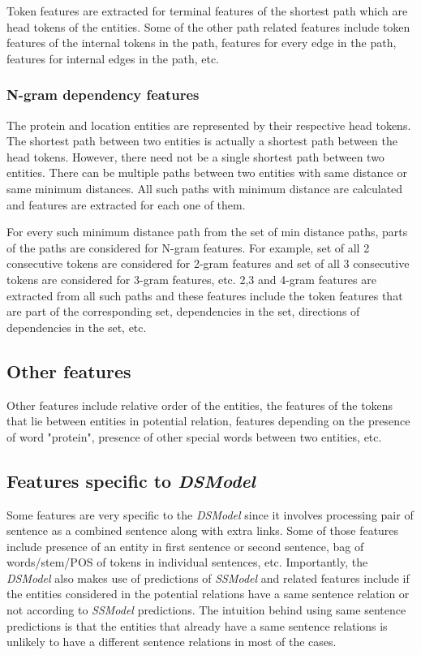 Token features are extracted for terminal features of the shortest path which are head tokens of the entities. Some of the other path related features include token features of the internal tokens in the path, features for every edge in the path, features for internal edges in the path, etc.

\subsubsection*{N-gram dependency features}

The protein and location entities are represented by their respective head tokens.  The shortest path between two entities is actually a shortest path between the head tokens. However, there need not be a single shortest path between two entities. There can be multiple paths between two entities with same distance or same minimum distances. All such paths with minimum distance are calculated and features are extracted for each one of them.

For every such minimum distance path from the set of min distance paths, parts of the paths are considered for N-gram features. For example, set of all 2 consecutive tokens are considered for 2-gram features and set of all 3 consecutive tokens are considered for 3-gram features, etc. 2,3 and 4-gram features are extracted from all such paths and these features include the token features that are part of the corresponding set, dependencies in the set, directions of dependencies in the set, etc. 

\subsection*{Other features}

Other features include relative order of the entities, the features of the tokens that lie between entities in potential relation, features depending on the presence of word "protein", presence of other special words between two entities, etc.

\subsection{Features specific to \textit{DSModel}}

Some features are very specific to the \textit{DSModel} since it involves processing pair of sentence as a combined sentence along with extra links. Some of those features include presence of an entity in first sentence or second sentence, bag of words/stem/POS of tokens in individual sentences, etc. Importantly, the \textit{DSModel} also makes use of predictions of \textit{SSModel} and related features include if the entities considered in the potential relations have a same sentence relation or not according to \textit{SSModel} predictions. The intuition behind using same sentence predictions is that the entities that already have a same sentence relations is unlikely to have a different sentence relations in most of the cases.

